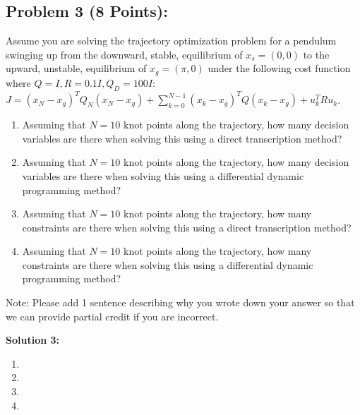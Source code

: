 \documentclass[]{article}
\begin{document}
\clearpage
\subsection*{Problem 3 (8 Points):}
Assume you are solving the trajectory optimization problem for a pendulum swinging up from the downward, stable, equilibrium of $x_s = (0,0)$ to the upward, unstable, equilibrium of $x_g = (\pi,0)$ under the following cost function where $Q=I, R = 0.1I, Q_D = 100I$:\\ $J = (x_N-x_g)^TQ_N(x_N-x_g) + \sum_{k=0}^{N-1} (x_k-x_g)^TQ(x_k-x_g) + u_k^TRu_k$.

\begin{enumerate}[label=(\alph*)]
    \item Assuming that $N=10$ knot points along the trajectory, how many decision variables are there when solving this using a direct transcription method?
    \item Assuming that $N=10$ knot points along the trajectory, how many decision variables are there when solving this using a differential dynamic programming method?
    \item Assuming that $N=10$ knot points along the trajectory, how many constraints are there when solving this using a direct transcription method?
    \item Assuming that $N=10$ knot points along the trajectory, how many constraints are there when solving this using a differential dynamic programming method?
\end{enumerate}

Note: Please add 1 sentence describing why you wrote down your answer so that we can provide partial credit if you are incorrect.

\textbf{Solution 3:}
\begin{enumerate}[label=(\alph*)]
    \item %
    \item %
    \item %
    \item %
\end{enumerate}

\clearpage
\end{document}

